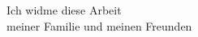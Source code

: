 \cleardoublepage

\null\vfill\itshape

\begin{flushright}
	Ich widme diese Arbeit \\
	meiner Familie und meinen Freunden
\end{flushright}
\thispagestyle{empty}
\upshape\cleardoublepage

